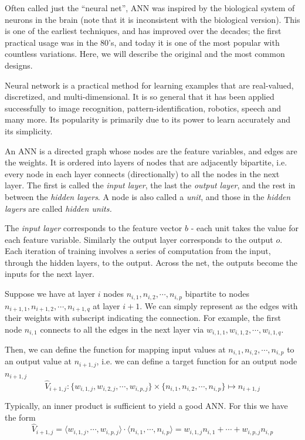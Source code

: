 \documentclass[12pt]{article}  %
\begin{document}
Often called just the ``neural net'', ANN was inspired by the biological system of neurons in the brain (note that it is inconsistent with the biological version). This is one of the earliest techniques, and has improved over the decades; the first practical usage was in the 80's, and today it is one of the most popular with countless variations. Here, we will describe the original and the most common designs.

Neural network is a practical method for learning examples that are real-valued, discretized, and multi-dimensional. It is so general that it has been applied successfully to image recognition, pattern-identification, robotics, speech and many more. Its popularity is primarily due to its power to learn accurately and its simplicity.

An ANN is a directed graph whose nodes are the feature variables, and edges are the weights. It is ordered into layers of nodes that are adjacently bipartite, i.e. every node in each layer connects (directionally) to all the nodes in the next layer. The first is called the {\em input layer}, the last the {\em output layer}, and the rest in between the {\em hidden layers}. A node is also called a {\em unit}, and those in the {\em hidden layers} are called {\em hidden units.}

The {\em input layer} corresponds to the feature vector $b$ - each unit takes the value for each feature variable. Similarly the output layer corresponds to the output $o$. Each iteration of training involves a series of computation from the input, through the hidden layers, to the output. Across the net, the outputs become the inputs for the next layer.

Suppose we have at layer $i$ nodes $n_{i,1}, n_{i,2}, \cdots, n_{i,p}$ bipartite to nodes $n_{i+1,1}, n_{i+1,2}, \cdots, n_{i+1,q}$ at layer $i+1$. We can simply represent as the edges with their weights with subscript indicating the connection. For example, the first node $n_{i,1}$ connects to all the edges in the next layer via $w_{i,1,1}, w_{i,1,2}, \cdots, w_{i,1,q}$.

Then, we can define the function for mapping input values at $n_{i,1}, n_{i,2}, \cdots, n_{i,p}$ to an output value at $n_{i+1,j}$, i.e. we can define a target function for an output node $n_{i+1,j}$ $$\hat{V}_{i+1,j} : \{ w_{i,1,j}, w_{i,2,j}, \cdots, w_{i,p,j} \} \times \{ n_{i,1}, n_{i,2}, \cdots, n_{i,p} \} \mapsto n_{i+1,j}$$

Typically, an inner product is sufficient to yield a good ANN. For this we have the form $$\hat{V}_{i+1,j} = \langle  w_{i,1,j}, \cdots, w_{i,p,j}  \rangle \cdot \langle  n_{i,1}, \cdots, n_{i,p}  \rangle = w_{i,1,j}n_{i,1} + \cdots + w_{i,p,j}n_{i,p}$$
\end{document}
